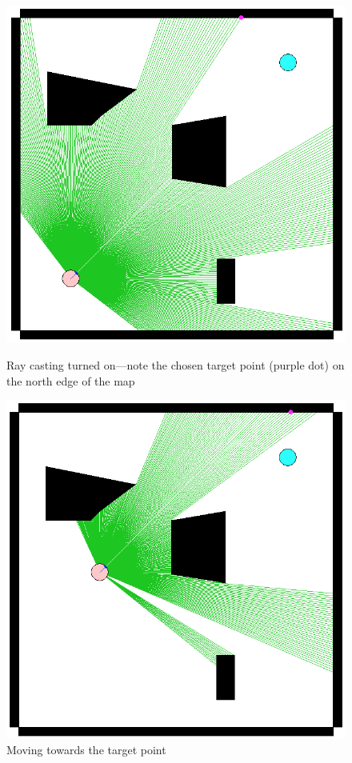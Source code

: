\documentclass{report}
\begin{document}
\begin{figure}
\begin{minipage}{\linewidth}
\begin{minipage}[t]{0.45\linewidth}
    \includegraphics[width=\linewidth]{ray2.png}
    \captionsetup{singlelinecheck=off}
    \caption[.]{\label{fig:ray2}Ray casting turned on---note the chosen target point
        (purple dot) on the north edge of the map}\end{minipage}
\begin{minipage}[t]{0.45\linewidth}
    \centering
    
    \includegraphics[width=\linewidth]{ray3.png}
    \captionsetup{singlelinecheck=off}
    \caption[.]{\label{fig:ray3}Moving towards the target point}
\end{minipage}
\hfill
\begin{minipage}[t]{0.45\linewidth}
    \centering
    

\end{minipage}
\end{minipage}
\end{figure}
\end{document}
